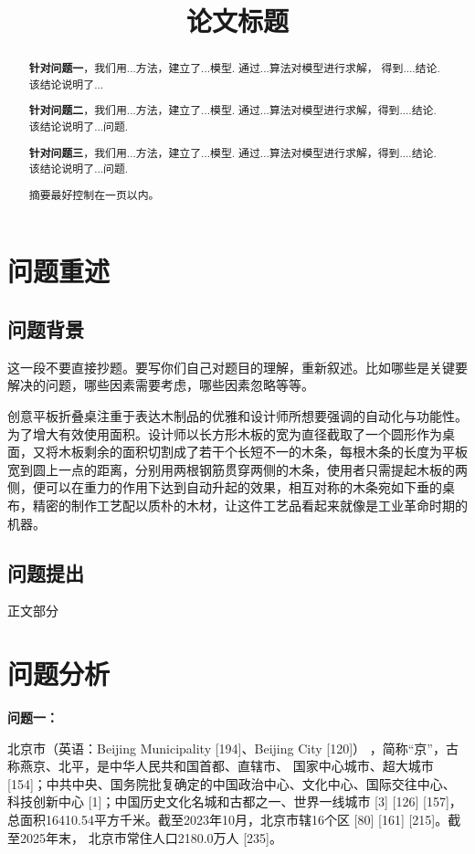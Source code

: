\documentclass{cumcm}
\title{论文标题}%
\begin{document}
 \maketitle
 \begin{abstract}
\textbf{针对问题一}，我们用...方法，建立了...模型. 通过...算法对模型进行求解，
得到....结论. 该结论说明了...

\textbf{针对问题二}，我们用...方法，建立了...模型. 通过...算法对模型进行求解，得到....结论. 该结论说明了...问题. 

\textbf{针对问题三}，我们用...方法，建立了...模型. 通过...算法对模型进行求解，得到....结论. 该结论说明了...问题. 




摘要最好控制在一页以内。
\end{abstract}


\section{问题重述}
\subsection{问题背景}

这一段不要直接抄题。要写你们自己对题目的理解，重新叙述。比如哪些是关键要解决的问题，哪些因素需要考虑，哪些因素忽略等等。

创意平板折叠桌注重于表达木制品的优雅和设计师所想要强调的自动化与功能性。为了增大有效使用面积。设计师以长方形木板的宽为直径截取了一个圆形作为桌面，又将木板剩余的面积切割成了若干个长短不一的木条，每根木条的长度为平板宽到圆上一点的距离，分别用两根钢筋贯穿两侧的木条，使用者只需提起木板的两侧，便可以在重力的作用下达到自动升起的效果，相互对称的木条宛如下垂的桌布，精密的制作工艺配以质朴的木材，让这件工艺品看起来就像是工业革命时期的机器。
\subsection{问题提出}

正文部分
\section{问题分析}


\textbf{问题一：}

北京市（英语：Beijing Municipality [194]、Beijing City [120]）
，简称“京”，古称燕京、北平，是中华人民共和国首都、直辖市、
国家中心城市、超大城市 [154]；中共中央、国务院批复确定的中国政治中心、文化中心、国际交往中心、科技创新中心 [1]；中国历史文化名城和古都之一、世界一线城市 [3] [126] [157]，总面积16410.54平方千米。截至2023年10月，北京市辖16个区 [80] [161] [215]。截至2025年末，
北京市常住人口2180.0万人 [235]。
\end{document}
